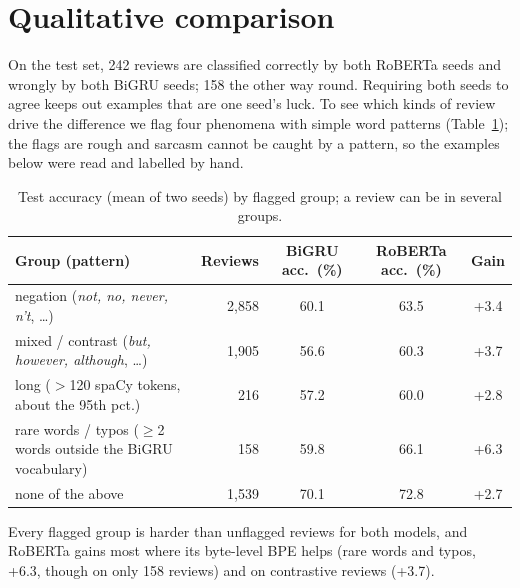 \documentclass[10pt,a4paper]{article}
\begin{document}
\section{Qualitative comparison}

On the test set, 242 reviews are classified correctly by both RoBERTa seeds and wrongly by both BiGRU seeds; 158 the
other way round. Requiring both seeds to agree keeps out examples that are one seed's luck. To see which kinds of
review drive the difference we flag four phenomena with simple word patterns (Table~\ref{tab:tags}); the flags are
rough and sarcasm cannot be caught by a pattern, so the examples below were read and labelled by hand.

\begin{table}[!htbp]
\centering\small
\begin{tabular}{@{}lrccc@{}}
\toprule
Group (pattern) & Reviews & BiGRU acc.\ (\%) & RoBERTa acc.\ (\%) & Gain \\
\midrule
negation (\emph{not, no, never, n't}, \ldots)          & 2{,}858 & 60.1 & 63.5 & +3.4 \\
mixed / contrast (\emph{but, however, although}, \ldots) & 1{,}905 & 56.6 & 60.3 & +3.7 \\
long ($>$120 spaCy tokens, about the 95th pct.)     &   216 & 57.2 & 60.0 & +2.8 \\
rare words / typos ($\geq$2 words outside the BiGRU vocabulary) & 158 & 59.8 & 66.1 & +6.3 \\
none of the above                                   & 1{,}539 & 70.1 & 72.8 & +2.7 \\
\bottomrule
\end{tabular}
\caption{Test accuracy (mean of two seeds) by flagged group; a review can be in several groups.}
\label{tab:tags}
\end{table}

Every flagged group is harder than unflagged reviews for both models, and RoBERTa gains most where its byte-level BPE
helps (rare words and typos, +6.3, though on only 158 reviews) and on contrastive reviews (+3.7).
\end{document}
